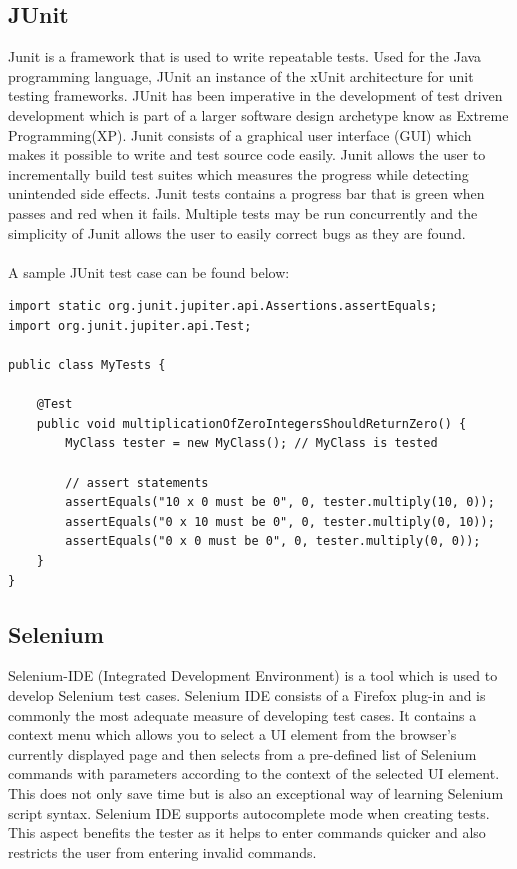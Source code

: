 \subsection{JUnit}
Junit is a framework that is used to write repeatable tests. Used for the Java programming language, JUnit an instance of the xUnit architecture for unit testing frameworks. JUnit has been imperative in the development of test driven development which is part of a larger software design archetype know as Extreme Programming(XP). Junit consists of a graphical user interface (GUI) which makes it possible to write and test source code easily. Junit allows the user to incrementally build test suites which measures the progress while detecting unintended side effects. Junit tests contains a progress bar that is green when passes and red when it fails. Multiple tests may be run concurrently and the simplicity of Junit allows the user to easily correct bugs as they are found\cite{JUnit1}.\\
\\
A sample JUnit test case can be found below\cite{JUnit}:

\begin{verbatim}
import static org.junit.jupiter.api.Assertions.assertEquals;
import org.junit.jupiter.api.Test;

public class MyTests {

    @Test
    public void multiplicationOfZeroIntegersShouldReturnZero() {
        MyClass tester = new MyClass(); // MyClass is tested

        // assert statements
        assertEquals("10 x 0 must be 0", 0, tester.multiply(10, 0));
        assertEquals("0 x 10 must be 0", 0, tester.multiply(0, 10));
        assertEquals("0 x 0 must be 0", 0, tester.multiply(0, 0));
    }
}
\end{verbatim}

\subsection{Selenium}
Selenium-IDE (Integrated Development Environment) is a tool which is used to develop Selenium test cases. Selenium IDE consists of a Firefox plug-in and is commonly the most adequate measure of developing test cases. It contains a context menu which allows you to select a UI element from the browser’s currently displayed page and then selects from a pre-defined list of Selenium commands with parameters according to the context of the selected UI element. This does not only save time but is also an exceptional way of learning Selenium script syntax. Selenium IDE supports autocomplete mode when creating tests. This aspect benefits the tester as it helps to enter commands quicker and also restricts the user from entering invalid commands\cite{Selenium}.


